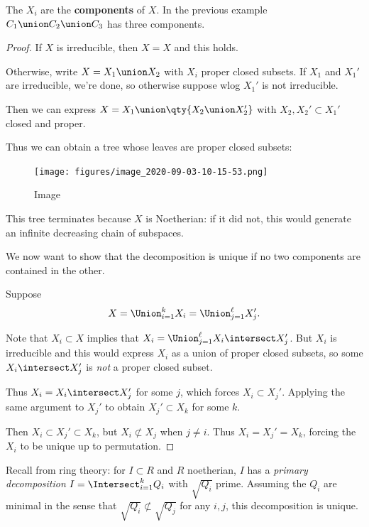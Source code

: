 \begin{remark}

The \(X_i\) are the \textbf{components} of \(X\). In the previous
example \(C_1 \union C_2 \union C_3\) has three components.

\end{remark}

\begin{proof}

If \(X\) is irreducible, then \(X=X\) and this holds.

Otherwise, write \(X = X_1 \union X_2\) with \(X_i\) proper closed
subsets. If \(X_1\) and \(X_1'\) are irreducible, we're done, so
otherwise suppose wlog \(X_1'\) is not irreducible.

Then we can express \(X = X_1 \union \qty{X_2 \union X_2'}\) with
\(X_2, X_2' \subset X_1'\) closed and proper.

Thus we can obtain a tree whose leaves are proper closed subsets:

\begin{figure}
\centering
\texttt{[image: figures/image\_2020-09-03-10-15-53.png]}
\caption{Image}
\end{figure}

This tree terminates because \(X\) is Noetherian: if it did not, this
would generate an infinite decreasing chain of subspaces.

We now want to show that the decomposition is unique if no two
components are contained in the other.

Suppose
\begin{align*}  
X= \Union_{i=1}^k X_i = \Union_{j=1}^\ell X_j'
.\end{align*}

Note that \(X_i \subset X\) implies that
\(X_i = \Union_{j=1}^\ell X_i \intersect X_j'\). But \(X_i\) is
irreducible and this would express \(X_i\) as a union of proper closed
subsets, so some \(X_i \intersect X_j'\) is \emph{not} a proper closed
subset.

Thus \(X_i = X_i \intersect X_j'\) for some \(j\), which forces
\(X_i \subset X_j'\). Applying the same argument to \(X_j'\) to obtain
\(X_j' \subset X_k\) for some \(k\).

Then \(X_i \subset X_j' \subset X_k\), but \(X_ i \not\subset X_j\) when
\(j\neq i\). Thus \(X_i = X_j' = X_k\), forcing the \(X_i\) to be unique
up to permutation.

\end{proof}

Recall from ring theory: for \(I\subset R\) and \(R\) noetherian, \(I\)
has a \emph{primary decomposition} \(I = \Intersect_{i=1}^k Q_i\) with
\(\sqrt{Q_i}\) prime. Assuming the \(Q_i\) are minimal in the sense that
\(\sqrt{Q_i} \not\subset \sqrt{Q_j}\) for any \(i, j\), this
decomposition is unique.

